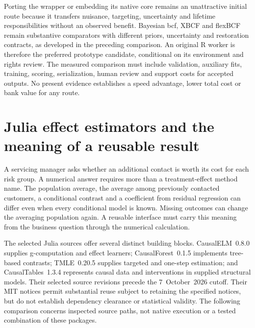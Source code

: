 Porting the wrapper or embedding its native core remains an unattractive initial route because it transfers nuisance, targeting, uncertainty and lifetime responsibilities without an observed benefit. Bayesian bcf, XBCF and flexBCF remain substantive comparators with different priors, uncertainty and restoration contracts, as developed in the preceding comparison. An original R worker is therefore the preferred prototype candidate, conditional on its environment and rights review. The measured comparison must include validation, auxiliary fits, training, scoring, serialization, human review and support costs for accepted outputs. No present evidence establishes a speed advantage, lower total cost or bank value for any route.~\citep{exec21_grf_reuse,exec21_cxx_bcf,exec21_cxx_xbcf,exec21_cxx_flexbcf}



\section{Julia effect estimators and the meaning of a reusable result}
\label{exec21:effects-scope}

A servicing manager asks whether an additional contact is worth its cost for
each risk group. A numerical answer requires more than a treatment-effect
method name. The population average, the average among previously contacted
customers, a conditional contrast and a coefficient from residual regression
can differ even when every conditional model is known. Missing outcomes can
change the averaging population again. A reusable interface must carry this
meaning from the business question through the numerical calculation.

The selected Julia sources offer several distinct building blocks.
CausalELM~0.8.0 supplies g-computation and effect learners; CausalForest~0.1.5
implements tree-based contrasts; TMLE~0.20.5 supplies targeted and one-step
estimation; and CausalTables~1.3.4 represents causal data and interventions in
supplied structural models. Their selected source revisions precede the
7~October~2026 cutoff. Their MIT notices permit substantial reuse subject to
retaining the specified notices, but do not establish dependency clearance or
statistical validity. The following comparison concerns inspected source
paths, not native execution or a tested combination of these packages.
\cite{exec21_effects_causalelm,exec21_effects_causalforest,exec21_effects_tmle,exec21_effects_causaltables}

